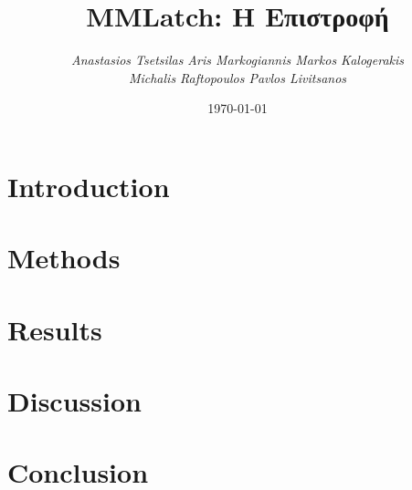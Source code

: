 \documentclass[10pt]{article}
\title{\textbf{MMLatch: Η Επιστροφή}}
\author{\textit{Anastasios Tsetsilas \qquad Aris Markogiannis \qquad Markos Kalogerakis \\ Michalis Raftopoulos \qquad Pavlos Livitsanos}}
\affil{National Technical University of Athens}
\date{\today}
\begin{document}
\maketitle
\begin{abstract}
    \lipsum[1] %
\end{abstract}

\begin{multicols}{2}

\section{Introduction}
\lipsum[2-3] %
	\cite{DBLP:journals/corr/abs-2201-09828}

\section{Methods}
\lipsum[4] %

\section{Results}
\lipsum[5] %

\section{Discussion}
\lipsum[6] %

\section{Conclusion}
\lipsum[7] %


\end{multicols}
\end{document}
